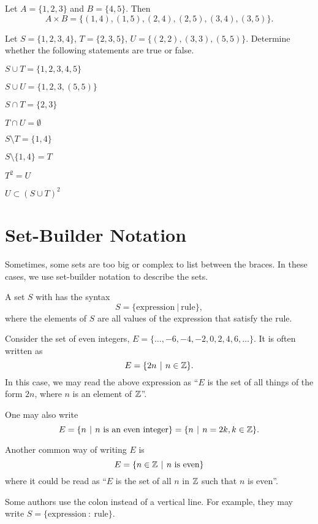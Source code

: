 \begin{example}
    Let $A = \{1, 2, 3\}$ and $B = \{4, 5\}$. Then
    \[
        A \times B = \{(1, 4), (1, 5), (2, 4), (2, 5), (3, 4), (3, 5)\}.
    \]
\end{example}

\begin{exercise}
    Let $S = \{1, 2, 3, 4\}$, $T = \{2, 3, 5\}$, $U = \{(2, 2), (3, 3), (5, 5)\}$. Determine whether the following statements are true or false.
    \begin{multicols}{2}
        \begin{partquestions}{\alph*}
            \item $S \cup T = \{1, 2, 3, 4, 5\}$
            \item $S \cup U = \{1, 2, 3, (5, 5)\}$
            \item $S \cap T = \{2, 3\}$
            \item $T \cap U = \emptyset$
            \item $S \setminus T = \{1, 4\}$
            \item $S \setminus \{1, 4\} = T$
            \item $T^2 = U$
            \item $U \subset (S \cup T)^2$
        \end{partquestions}
    \end{multicols}
\end{exercise}

\section{Set-Builder Notation}
Sometimes, some sets are too big or complex to list between the braces. In these cases, we use set-builder notation to describe the sets.
\begin{definition}
    A set $S$ with  has the syntax
    \[
        S = \{\mathrm{expression} \ | \ \mathrm{rule}\},
    \]
    where the elements of $S$ are all values of the expression that satisfy the rule.
\end{definition}

\begin{example}
    Consider the set of even integers, $E = \{\dots, -6, -4, -2, 0, 2, 4, 6, \dots\}$. It is often written as
    \[
        E = \{2n \vert n \in \Z\}.
    \]
    In this case, we may read the above expression as ``$E$ is the set of all things of the form $2n$, where $n$ is an element of $\mathbb{Z}$''.

    One may also write
    \[
        E = \{n \vert n \textrm{ is an even integer}\} = \{n \vert n = 2k, k \in \Z\}.
    \]

    Another common way of writing $E$ is
    \[
        E = \{n \in \Z \vert n \textrm{ is even}\}
    \]
    where it could be read as ``$E$ is the set of all $n$ in $\mathbb{Z}$ such that $n$ is even''.
\end{example}
\begin{remark}
    Some authors use the colon instead of a vertical line. For example, they may write $S = \{\mathrm{expression} \ : \ \mathrm{rule}\}$.
\end{remark}

